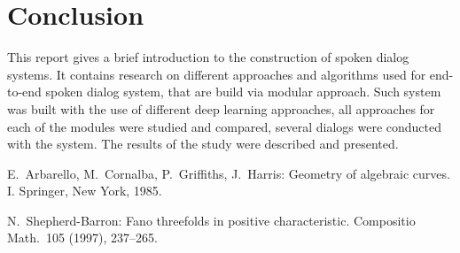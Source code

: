 \documentclass[12pt,titlepage,a4paper]{article}
\begin{document}
\pagebreak

\section{Conclusion}
This report gives a brief introduction to the construction of spoken dialog systems. It contains research on different approaches and algorithms used for end-to-end spoken dialog system, that are build via modular approach. Such system was built with the use of different deep learning approaches, all approaches for each of the modules were studied and compared, several dialogs were conducted with the system. The results of the study were described and presented.

\pagebreak
\begin{thebibliography}{ccccc}

E.\ Arbarello, M.\ Cornalba, P.\ Griffiths, J.\ Harris:
Geometry of algebraic curves. I. 
Springer, New York, 1985.

N.\ Shepherd-Barron:
Fano threefolds in positive characteristic.
Compositio Math.\  105  (1997),  237--265.

\end{thebibliography}
\end{document}
